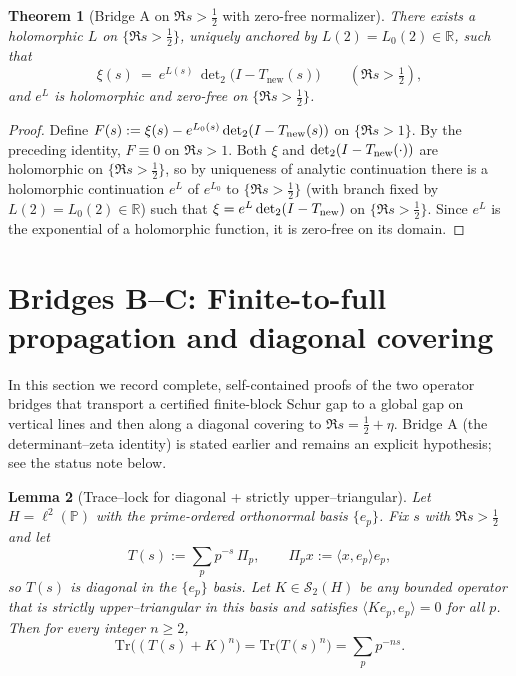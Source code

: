 \documentclass[11pt]{article}
\newtheorem{theorem}{Theorem}
\newtheorem{lemma}[theorem]{Lemma}
\theoremstyle{definition}
\theoremstyle{remark}
\newcommand{\R}{\mathbb{R}}
\begin{document}
\begin{theorem}[Bridge A on $\Re s>\tfrac12$ with zero-free normalizer]\label{thm:hardened-bridgeA}
There exists a holomorphic $L$ on $\{\Re s>\tfrac12\}$, uniquely anchored by $L(2)=L_0(2)\in\R$, such that
\[
  \xi(s)\ =\ e^{L(s)}\,\det\nolimits_2\!\big(I-T_{\mathrm{new}}(s)\big)\qquad(\Re s>\tfrac12),
\]
and $e^{L}$ is holomorphic and zero-free on $\{\Re s>\tfrac12\}$.
\end{theorem}

\begin{proof}
Define $F(s):=\xi(s)-e^{L_0(s)}\det_2(I-T_{\rm new}(s))$ on $\{\Re s>1\}$. By the preceding identity, $F\equiv 0$ on $\Re s>1$. Both $\xi$ and $\det_2(I-T_{\rm new}(\cdot))$ are holomorphic on $\{\Re s>\tfrac12\}$, so by uniqueness of analytic continuation there is a holomorphic continuation $e^{L}$ of $e^{L_0}$ to $\{\Re s>\tfrac12\}$ (with branch fixed by $L(2)=L_0(2)\in\R$) such that $\xi=e^{L}\det_2(I-T_{\rm new})$ on $\{\Re s>\tfrac12\}$. Since $e^{L}$ is the exponential of a holomorphic function, it is zero-free on its domain.
\end{proof}

\section{Bridges B--C: Finite-to-full propagation and diagonal covering}

In this section we record complete, self-contained proofs of the two operator bridges that transport a certified finite-block Schur gap to a global gap on vertical lines and then along a diagonal covering to $\Re s=\tfrac12+\eta$. Bridge A (the determinant--zeta identity) is stated earlier and remains an explicit hypothesis; see the status note below.

\begin{lemma}[Trace--lock for diagonal + strictly upper--triangular]\label{lem:trace-lock}
Let $H=\ell^2(\mathbb{P})$ with the prime-ordered orthonormal basis $\{e_p\}$. Fix $s$ with $\Re s> \tfrac12$ and let 
\[
T(s):=\sum_{p} p^{-s}\,\Pi_p,\qquad \Pi_p x:=\langle x,e_p\rangle e_p,
\]
so $T(s)$ is diagonal in the $\{e_p\}$ basis. Let $K\in \mathcal S_2(H)$ be any bounded operator that is strictly upper--triangular in this basis and satisfies $\langle Ke_p,e_p\rangle=0$ for all $p$. Then for every integer $n\ge 2$,
\[
\mathrm{Tr}\big((T(s)+K)^n\big)=\mathrm{Tr}\big(T(s)^n\big)=\sum_{p} p^{-ns}.
\]
\end{lemma}
\end{document}

